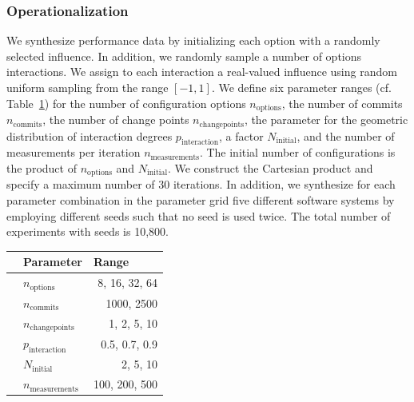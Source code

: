 \documentclass[sigconf]{acmart}
\begin{document}
	\subsubsection{Operationalization}
	We synthesize performance data by initializing each option with a randomly selected influence. In addition, we randomly sample a number of options interactions. We assign to each interaction a real-valued influence using random uniform sampling from the range $[-1, 1]$. We define six parameter ranges (cf. Table~\ref{tab:synthetic_experiment_ranges}) for the number of configuration options $n_\text{options}$, the number of commits $n_\text{commits}$, the number of change points $n_\text{changepoints}$, the parameter for the geometric distribution of interaction degrees $p_\text{interaction}$, a factor $N_\text{initial}$, and the number of measurements per iteration $n_\text{measurements}$. The initial number of configurations is the product of $n_\text{options}$ and $N_\text{initial}$. We construct the Cartesian product and specify a maximum number of 30 iterations. In addition, we synthesize for each parameter combination in the parameter grid five different software systems by employing different seeds such that no seed is used twice. The total number of experiments with seeds is 10,800.%
	
	\begin{table}
		\centering
		\label{tab:synthetic_experiment_ranges}
		\begin{tabular}{llr}
			\toprule
			\textbf{}                & \textbf{Parameter}        & \multicolumn{1}{l}{\textbf{Range}} \\
			\midrule
			\parbox[t]{5mm}{} & $n_\text{options}$                & 8, 16, 32, 64                \\
			& $n_\text{commits}$                & 1000, 2500                \\
			& $n_\text{changepoints}$           & 1, 2, 5, 10                        \\
			& $p_\text{interaction}$ & 0.5, 0.7, 0.9                     \\
			\midrule
			\parbox[t]{5mm}{}   & $N_\text{initial}$       & 2, 5, 10                           \\
			& $n_\text{measurements}$           & 100, 200, 500                      \\
			\bottomrule            
		\end{tabular}
	\end{table}
	
\end{document}

